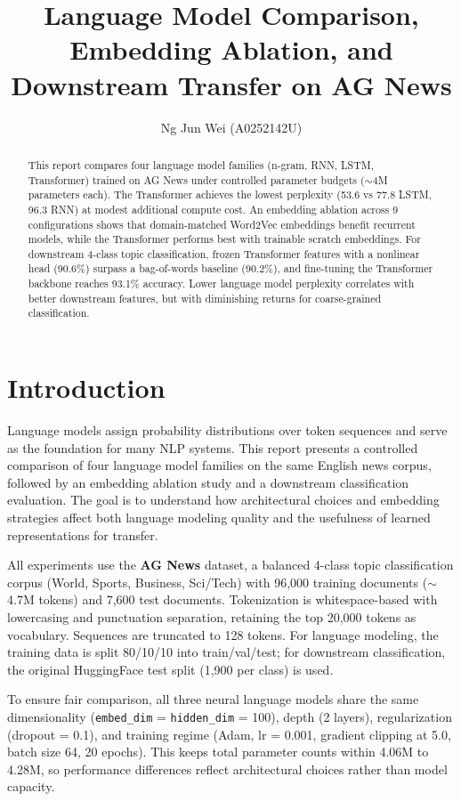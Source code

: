 \documentclass[11pt]{article}
\title{Language Model Comparison, Embedding Ablation, and Downstream Transfer on AG News}
\author[1]{Ng Jun Wei (A0252142U)}
\affil[1]{National University of Singapore}
\date{}
\begin{document}
\maketitle

\begin{abstract}
This report compares four language model families (n-gram, RNN, LSTM, Transformer) trained on AG News under controlled parameter budgets ($\sim$4M parameters each). The Transformer achieves the lowest perplexity (53.6 vs 77.8 LSTM, 96.3 RNN) at modest additional compute cost. An embedding ablation across 9 configurations shows that domain-matched Word2Vec embeddings benefit recurrent models, while the Transformer performs best with trainable scratch embeddings. For downstream 4-class topic classification, frozen Transformer features with a nonlinear head (90.6\%) surpass a bag-of-words baseline (90.2\%), and fine-tuning the Transformer backbone reaches 93.1\% accuracy. Lower language model perplexity correlates with better downstream features, but with diminishing returns for coarse-grained classification.
\end{abstract}

\section{Introduction}

Language models assign probability distributions over token sequences and serve as the foundation for many NLP systems. This report presents a controlled comparison of four language model families on the same English news corpus, followed by an embedding ablation study and a downstream classification evaluation. The goal is to understand how architectural choices and embedding strategies affect both language modeling quality and the usefulness of learned representations for transfer.

All experiments use the \textbf{AG News} dataset, a balanced 4-class topic classification corpus (World, Sports, Business, Sci/Tech) with 96,000 training documents ($\sim$4.7M tokens) and 7,600 test documents. Tokenization is whitespace-based with lowercasing and punctuation separation, retaining the top 20,000 tokens as vocabulary. Sequences are truncated to 128 tokens. For language modeling, the training data is split 80/10/10 into train/val/test; for downstream classification, the original HuggingFace test split (1,900 per class) is used.

To ensure fair comparison, all three neural language models share the same dimensionality (\texttt{embed\_dim} = \texttt{hidden\_dim} = 100), depth (2 layers), regularization (dropout = 0.1), and training regime (Adam, lr = 0.001, gradient clipping at 5.0, batch size 64, 20 epochs). This keeps total parameter counts within 4.06M to 4.28M, so performance differences reflect architectural choices rather than model capacity.
\end{document}
